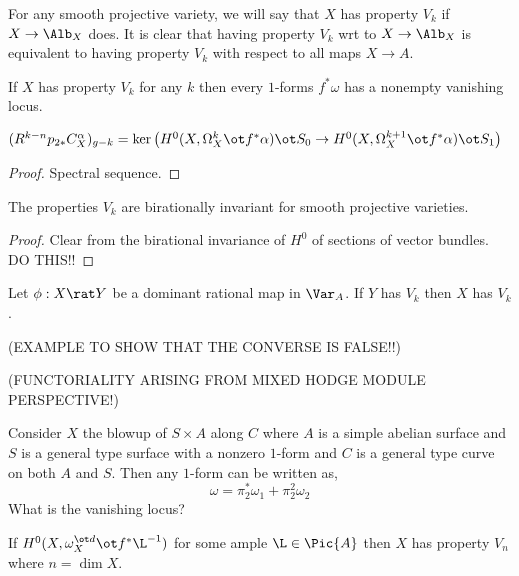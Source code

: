 \documentclass[12pt]{article}
\begin{document}
\begin{rmk}
For any smooth projective variety, we will say that $X$ has property $V_k$ if $X \to \Alb_X$ does. It is clear that having property $V_k$ wrt to $X \to \Alb_X$ is equivalent to having property $V_k$ with respect to all maps $X \to A$. 
\end{rmk}

\begin{prop}
If $X$ has property $V_k$ for any $k$ then every $1$-forms $f^* \omega$ has a nonempty vanishing locus. 
\end{prop}

\begin{lemma}
$ (R^{k-n} p_{2*} C_X^\alpha)_{g-k} = \ker{\left( H^0(X, \Omega^k_X \ot f^* \alpha) \ot S_0 \to H^0(X, \Omega^{k+1}_X \ot f^* \alpha) \ot S_1 \right)} $
\end{lemma}

\begin{proof}
Spectral sequence.
\end{proof}

\begin{prop}
The properties $V_k$ are birationally invariant for smooth projective varieties.
\end{prop}

\begin{proof}
Clear from the birational invariance of $H^0$ of sections of vector bundles. DO THIS!!
\end{proof}

\begin{prop} \label{prop:rational_map_functoriality}
Let $\phi : X \rat Y$ be a dominant rational map in $\Var_A$. If $Y$ has $V_k$ then $X$ has $V_k$. 
\end{prop}

(EXAMPLE TO SHOW THAT THE CONVERSE IS FALSE!!)

(FUNCTORIALITY ARISING FROM MIXED HODGE MODULE PERSPECTIVE!)

\begin{example}
Consider $X$ the blowup of $S \times A$ along $C$ where $A$ is a simple abelian surface and $S$ is a general type surface with a nonzero $1$-form and $C$ is a general type curve on both $A$ and $S$. Then any $1$-form can be written as,
\[ \omega = \pi_2^* \omega_1 + \pi_2^2 \omega_2 \]
What is the vanishing locus?
\end{example}

\begin{theorem}[CITE]
If $H^0(X, \omega_X^{\ot d} \ot f^* \L^{-1})$ for some ample $\L \in \Pic{A}$ then $X$ has property $V_n$ where $n = \dim{X}$. 
\end{theorem}
\end{document}
